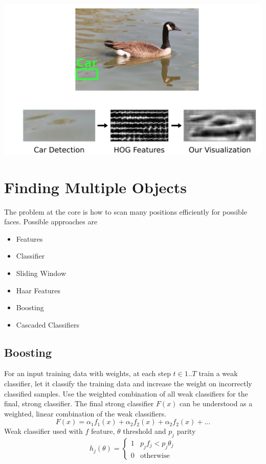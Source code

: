 \documentclass[11pt]{article}
\theoremstyle{definition}
\begin{document}
\begin{center}
	\includegraphics[width=0.6\linewidth]{img/HOGles}
\end{center}

\section{Finding Multiple Objects}
The problem at the core is how to scan many positions efficiently for possible faces. Possible approaches are
\begin{itemize}[label=-, nosep]
	\item {\color{DodgerBlue4} Features}
	\item {\color{DodgerBlue4} Classifier}
	\item {\color{DodgerBlue4} Sliding Window}
	\item {\color{Firebrick1} Haar Features}
	\item {\color{Firebrick1} Boosting}
	\item {\color{Firebrick1} Cascaded Classifiers}
\end{itemize}

\subsection{Boosting}
For an input training data with weights, at each step $t \in 1..T$ train a weak classifier, let it classify the training data and increase the weight on incorrectly classified samples. Use the weighted combination of all weak classifiers for the final, strong classifier. The final strong classifier $F(x)$ can be understood as a weighted, linear combination of the weak classifiers.
\begin{equation*}
	F(x) = \alpha_1 f_1(x) + \alpha_2 f_2(x) + \alpha_2 f_2(x) + \dots
\end{equation*}
Weak classifier used with $f$ feature, $\theta$ threshold and $p_j$ parity
\begin{equation*}
	h_j (\theta) = \left\{ \begin{matrix}
		1 & p_j f_j < p_j \theta_j\\
		0 & \text{otherwise}
		\end{matrix} \right.
\end{equation*}
\end{document}
